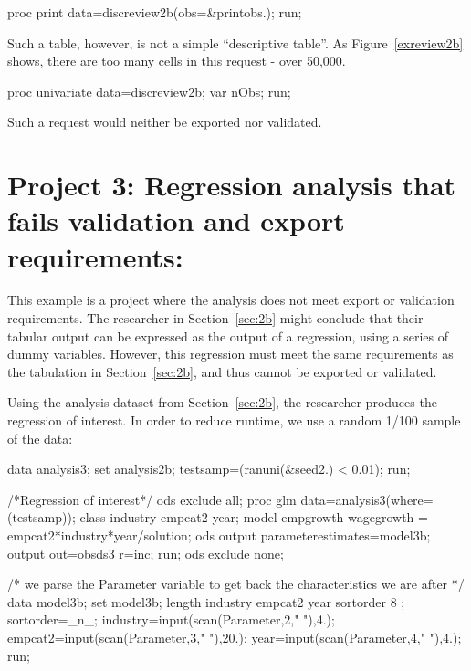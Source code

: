 \documentclass{article}
\begin{document}
\begin{Sascode}[store=discBcsv,program]
proc print data=discreview2b(obs=&printobs.);
run;
\end{Sascode}

Such a table, however, is not a simple ``descriptive table''. As Figure~\ref{exreview2b} shows, there are too many cells in this request - over 50,000.  

\begin{Sascode}[store=exreview2b,program]
proc univariate data=discreview2b;
var nObs;
run;
\end{Sascode}

Such a request would neither be exported nor validated.


\newpage
\section{Project 3:  Regression analysis that fails validation and export requirements:}
\label{sec:3}
This example is a project where the analysis does not meet export or validation requirements.  The researcher in Section~\ref{sec:2b} might  conclude that their tabular output can 
be expressed as the output of a regression, using a series of dummy variables.  However, this regression must meet the same requirements as the tabulation in Section~\ref{sec:2b}, and thus cannot
be exported or validated.

Using the analysis dataset from Section~\ref{sec:2b}, the researcher produces the regression of interest.  In order to reduce runtime, we use a random 1/100 sample of the data:
\begin{Datastep}
data analysis3;
	set analysis2b;
	testsamp=(ranuni(&seed2.) < 0.01);
	run;
	\end{Datastep}
	
\begin{Sascode}
/*Regression of interest*/
ods exclude all;
proc glm data=analysis3(where=(testsamp));
class industry empcat2 year;
model empgrowth wagegrowth = empcat2*industry*year/solution;
ods output parameterestimates=model3b;
output out=obsds3 r=inc;
run;
ods exclude none;

/* we parse the  Parameter variable to get back the characteristics we are after */
data model3b;
  set model3b;
  length industry empcat2 year sortorder 8 ;
  sortorder=_n_;
  industry=input(scan(Parameter,2," "),4.);
  empcat2=input(scan(Parameter,3," "),20.);
  year=input(scan(Parameter,4," "),4.);
run;
\end{Sascode}
\end{document}
